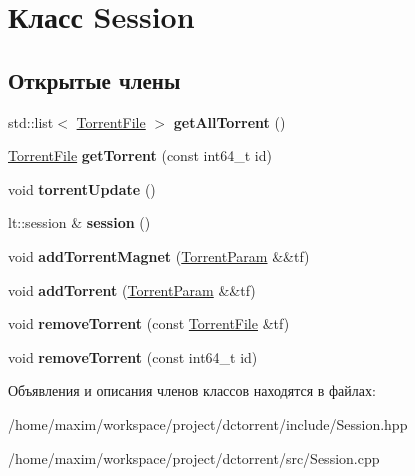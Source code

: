 \hypertarget{class_session}{}\section{Класс Session}
\label{class_session}
\subsection*{Открытые члены}
\begin{DoxyCompactItemize}
\item 
\mbox{\label{class_session_a6737074b34547727cd703250d8374d06}} 
std\+::list$<$ \hyperlink{class_torrent_file}{Torrent\+File} $>$ {\bfseries get\+All\+Torrent} ()
\item 
\mbox{\label{class_session_a79df8817751b97160c096e3cf149d845}} 
\hyperlink{class_torrent_file}{Torrent\+File} {\bfseries get\+Torrent} (const int64\+\_\+t id)
\item 
\mbox{\label{class_session_a30028efacc66ba9a49455c4cff0b325a}} 
void {\bfseries torrent\+Update} ()
\item 
\mbox{\label{class_session_ae651253171e918d5d6b1a1081ebe8f32}} 
lt\+::session \& {\bfseries session} ()
\item 
\mbox{\label{class_session_aa160f757e11e9e68075d28ae1309ae85}} 
void {\bfseries add\+Torrent\+Magnet} (\hyperlink{class_torrent_param}{Torrent\+Param} \&\&tf)
\item 
\mbox{\label{class_session_ac6bbf71f6931ee121fb169fb134d9395}} 
void {\bfseries add\+Torrent} (\hyperlink{class_torrent_param}{Torrent\+Param} \&\&tf)
\item 
\mbox{\label{class_session_adc5d2ea634964b3898fdb7b600e1ea87}} 
void {\bfseries remove\+Torrent} (const \hyperlink{class_torrent_file}{Torrent\+File} \&tf)
\item 
\mbox{\label{class_session_a372beddfe745b1b3620960ee8698738a}} 
void {\bfseries remove\+Torrent} (const int64\+\_\+t id)
\end{DoxyCompactItemize}


Объявления и описания членов классов находятся в файлах\+:\begin{DoxyCompactItemize}
\item 
/home/maxim/workspace/project/dctorrent/include/Session.\+hpp\item 
/home/maxim/workspace/project/dctorrent/src/Session.\+cpp\end{DoxyCompactItemize}
